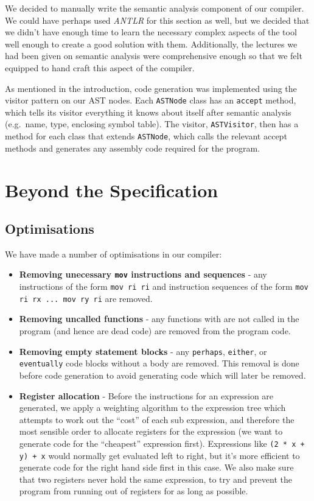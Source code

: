 \documentclass[11pt, notitlepage]{report}
\begin{document}
We decided to manually write the semantic analysis component of our compiler. We could have perhaps used \emph{ANTLR} for this section as well, but we decided that we didn't have enough time to learn the necessary complex aspects of the tool well enough to create a good solution with them. Additionally, the lectures we had been given on semantic analysis were comprehensive enough so that we felt equipped to hand craft this aspect of the compiler.

As mentioned in the introduction, code generation was implemented using the visitor pattern on our AST nodes. Each \texttt{ASTNode} class has an \texttt{accept} method, which tells its visitor everything it knows about itself after semantic analysis (e.g.\ name, type, enclosing symbol table). The visitor, \texttt{ASTVisitor}, then has a method for each class that extends \texttt{ASTNode}, which calls the relevant accept methods and generates any assembly code required for the program.

\section*{Beyond the Specification}
\subsection*{Optimisations}
We have made a number of optimisations in our compiler:
\begin{itemize}
\item \textbf{Removing unecessary \texttt{mov} instructions and sequences} - any instructions of the form \texttt{mov ri ri} and instruction sequences of the form \texttt{mov ri rx ... mov ry ri} are removed.
\item \textbf{Removing uncalled functions} - any functions with are not called in the program (and hence are dead code) are removed from the program code.
\item \textbf{Removing empty statement blocks} - any \texttt{perhaps}, \texttt{either}, or \texttt{eventually} code blocks without a body are removed. This removal is done before code generation to avoid generating code which will later be removed.
\item \textbf{Register allocation} - Before the instructions for an expression are generated, we apply a weighting algorithm to the expression tree which attempts to work out the ``cost'' of each sub expression, and therefore the most sensible order to allocate registers for the expression (we want to generate code for the ``cheapest'' expression first). Expressions like \texttt{(2 * x + y) + x} would normally get evaluated left to right, but it's more efficient to generate code for the right hand side first in this case. We also make sure that two registers never hold the same expression, to try and prevent the program from running out of registers for as long as possible.
\end{itemize}
\end{document}
